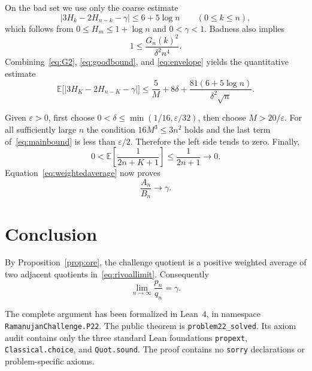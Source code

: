 \documentclass[11pt]{article}
\newcommand{\E}{\mathbb E}
\begin{document}
On the bad set we use only the coarse estimate
\begin{equation}\label{eq:envelope}
 |3H_k-2H_{n-k}-\gamma|\le6+5\log n
 \qquad(0\le k\le n),
\end{equation}
which follows from $0\le H_m\le1+\log n$ and $0<\gamma<1$.
Badness also implies
\[
 1\le\frac{G_n(k)^2}{\delta^2n^4}.
\]
Combining~\eqref{eq:G2}, \eqref{eq:goodbound}, and
\eqref{eq:envelope} yields the quantitative estimate
\begin{equation}\label{eq:mainbound}
 \E\bigl[|3H_K-2H_{n-K}-\gamma|\bigr]
 \le \frac5M+8\delta+
 \frac{81(6+5\log n)}{\delta^2\sqrt n}.
\end{equation}

Given $\varepsilon>0$, first choose
$0<\delta\le\min(1/16,\varepsilon/32)$, then choose
$M>20/\varepsilon$.  For all sufficiently large $n$ the condition
$16M^3\le3n^2$ holds and the last term of~\eqref{eq:mainbound} is less
than $\varepsilon/2$.  Therefore the left side tends to zero.  Finally,
\[
 0<\E\!\left[\frac1{2n+K+1}\right]\le\frac1{2n+1}\longrightarrow0.
\]
Equation~\eqref{eq:weightedaverage} now proves
\begin{equation}\label{eq:rivoallimit}
 \frac{A_n}{B_n}\longrightarrow\gamma.
\end{equation}

\section{Conclusion}

By Proposition~\ref{prop:ore}, the challenge quotient is a positive weighted
average of two adjacent quotients in~\eqref{eq:rivoallimit}.  Consequently
\[
 \boxed{\displaystyle\lim_{n\to\infty}\frac{p_n}{q_n}=\gamma}.
\]

The complete argument has been formalized in Lean~4, in namespace
\texttt{RamanujanChallenge.P22}.  The public theorem is
\texttt{problem22\_solved}.  Its axiom audit contains only the three standard
Lean foundations \texttt{propext}, \texttt{Classical.choice}, and
\texttt{Quot.sound}.  The proof contains no \texttt{sorry} declarations or
problem-specific axioms.
\end{document}
